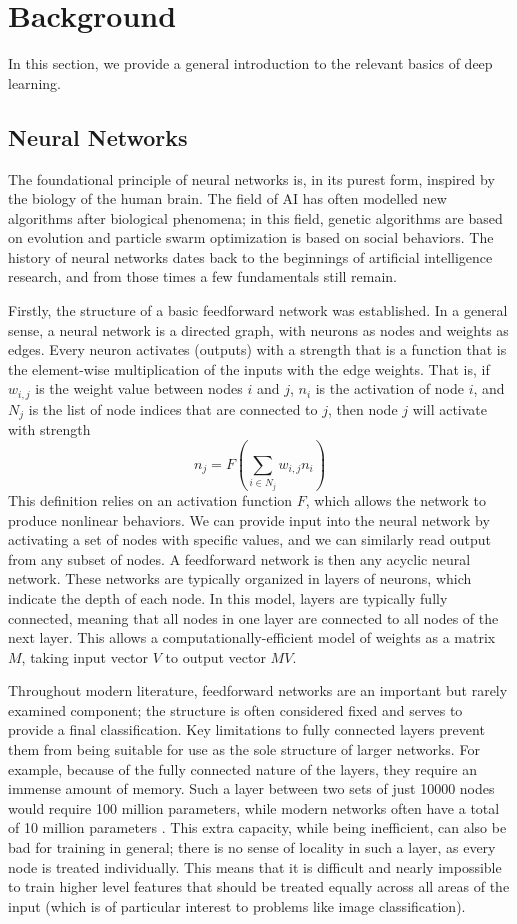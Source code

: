 \chapter{Background}

In this section, we provide a general introduction to the relevant basics of deep learning.


\section{Neural Networks}
The foundational principle of neural networks is, in its purest form, inspired by the biology of the human brain.
The field of AI has often modelled new algorithms after biological phenomena; in this field, genetic algorithms are based on evolution and particle swarm optimization is based on social behaviors.
The history of neural networks dates back to the beginnings of artificial intelligence research, and from those times a few fundamentals still remain.

Firstly, the structure of a basic feedforward network was established.
In a general sense, a neural network is a directed graph, with neurons as nodes and weights as edges.
Every neuron activates (outputs) with a strength that is a function that is the element-wise multiplication of the inputs with the edge weights.
That is, if $w_{i,j}$ is the weight value between nodes $i$ and $j$, $n_i$ is the activation of node $i$, and $N_j$ is the list of node indices that are connected to $j$, then node $j$ will activate with strength
\[n_j = F\left(\sum_{i \in N_j} w_{i,j}n_i \right)\]
This definition relies on an activation function $F$, which allows the network to produce nonlinear behaviors.
We can provide input into the neural network by activating a set of nodes with specific values, and we can similarly read output from any subset of nodes.
A feedforward network is then any acyclic neural network.
These networks are typically organized in layers of neurons, which indicate the depth of each node.
In this model, layers are typically fully connected, meaning that all nodes in one layer are connected to all nodes of the next layer.
This allows a computationally-efficient model of weights as a matrix $M$, taking input vector $V$ to output vector $MV$.

Throughout modern literature, feedforward networks are an important but rarely examined component; the structure is often considered fixed and serves to provide a final classification.
Key limitations to fully connected layers prevent them from being suitable for use as the sole structure of larger networks.
For example, because of the fully connected nature of the layers, they require an immense amount of memory.
Such a layer between two sets of just 10000 nodes would require 100 million parameters, while modern networks often have a total of 10 million parameters \cite{han2015learning}.
This extra capacity, while being inefficient, can also be bad for training in general; there is no sense of locality in such a layer, as every node is treated individually.
This means that it is difficult and nearly impossible to train higher level features that should be treated equally across all areas of the input (which is of particular interest to problems like image classification).


